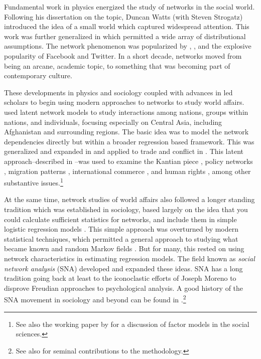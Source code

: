 \documentclass[12pt,oneside,doublespace,pdflatex]{amsart}
\begin{document}
Fundamental work in physics energized the study of networks in the social world.  Following his dissertation on the topic,
Duncan Watts (with Steven Strogatz) introduced the idea of a small world \citep{watts:strogatz:1998,watts:2004a} which captured widespread attention. This work was further generalized in \citet{newman:etal:2001} which permitted
a wide array of distributional assumptions.  The network phenomenon was popularized by 
\citet{watts:2004}, \cite{christakis:fowler:2009}, and the explosive popularity of Facebook and Twitter.  In a short decade,
networks moved from being an arcane, academic topic, to something that was becoming part of contemporary culture.

These developments in physics and sociology coupled with advances in led scholars to begin using
modern approaches to networks to study world affairs.  \citet{ward:hoff:etal:2003} used latent network
models to study interactions among nations, groups within nations, and individuals, focusing especially on Central Asia, including Afghanistan and surrounding regions. The basic idea was to model the network dependencies directly but within a broader regression based framework. This was generalized and expanded in \citet{hoff:ward:2004} and applied to trade and conflict in \citep{ward:hoff:2007}. This latent approach--described in \citet{dorff:ward:2013}--was used to examine the Kantian piece \citep{ward:siverson:cao:2007}, policy networks \citep{cao:2009,cao:2010}, migration patterns \citep{breunig:cao:etal:2011}, international commerce \cite{ward:ahlquist:etal:2012},  and human rights \citep{greenhill:2015}, among other substantive issues.\footnote{See also the working paper by \citet{stewart:2014} for a discussion of factor models in the social sciences.}

At the same time, network studies of world affairs also followed a longer standing tradition which was established in sociology, based largely on the idea that you could calculate sufficient statistics for networks, and include them in simple logistic regression models \citep{frank:1971,besag:1977b}.  This simple approach was overturned by modern statistical techniques, which permitted a general approach to studying what became known and random Markov fields \citep{besag:1985,besag:clifford:1989}. But for many, this rested on using network characteristics in estimating regression models. The field known as {\em social network analysis} (SNA) developed and expanded these ideas.  SNA has a long tradition going back at least to the iconoclastic efforts of Joseph Moreno \citeyear{moreno:1934} to disprove Freudian approaches to psychological analysis.  A good history of the SNA movement in sociology and beyond can be found in \citet{freeman:2004}.\footnote{See also \cite{white:1963,granovetter:1973,white:boorman:breiger:1976,freeman:1978,burt:1982,freeman:2000} for seminal contributions to the methodology.}
\end{document}
